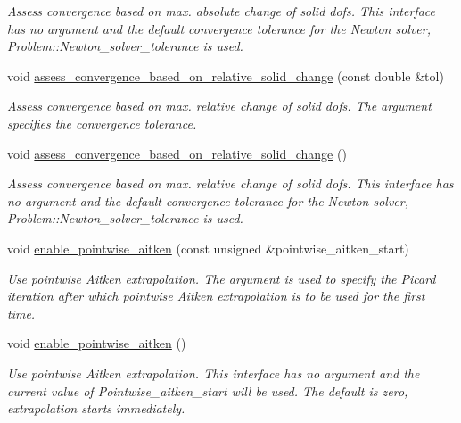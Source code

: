 \begin{DoxyCompactItemize}
\begin{DoxyCompactList}\small\item\em Assess convergence based on max. absolute change of solid dofs. This interface has no argument and the default convergence tolerance for the Newton solver, Problem\+::\+Newton\+\_\+solver\+\_\+tolerance is used. \end{DoxyCompactList}\item 
void \hyperlink{classoomph_1_1SegregatableFSIProblem_abec6313054e23d998b4584f2de80bc52}{assess\+\_\+convergence\+\_\+based\+\_\+on\+\_\+relative\+\_\+solid\+\_\+change} (const double \&tol)
\begin{DoxyCompactList}\small\item\em Assess convergence based on max. relative change of solid dofs. The argument specifies the convergence tolerance. \end{DoxyCompactList}\item 
void \hyperlink{classoomph_1_1SegregatableFSIProblem_af95d2c3833b64d37635e2e07776cef54}{assess\+\_\+convergence\+\_\+based\+\_\+on\+\_\+relative\+\_\+solid\+\_\+change} ()
\begin{DoxyCompactList}\small\item\em Assess convergence based on max. relative change of solid dofs. This interface has no argument and the default convergence tolerance for the Newton solver, Problem\+::\+Newton\+\_\+solver\+\_\+tolerance is used. \end{DoxyCompactList}\item 
void \hyperlink{classoomph_1_1SegregatableFSIProblem_a08c87f24c9e3ea80182a4b19d3a9fa92}{enable\+\_\+pointwise\+\_\+aitken} (const unsigned \&pointwise\+\_\+aitken\+\_\+start)
\begin{DoxyCompactList}\small\item\em Use pointwise Aitken extrapolation. The argument is used to specify the Picard iteration after which pointwise Aitken extrapolation is to be used for the first time. \end{DoxyCompactList}\item 
void \hyperlink{classoomph_1_1SegregatableFSIProblem_a3f52d9c6555b43d8ada274ec80940c13}{enable\+\_\+pointwise\+\_\+aitken} ()
\begin{DoxyCompactList}\small\item\em Use pointwise Aitken extrapolation. This interface has no argument and the current value of Pointwise\+\_\+aitken\+\_\+start will be used. The default is zero, extrapolation starts immediately. \end{DoxyCompactList}\item 

\end{DoxyCompactItemize}
